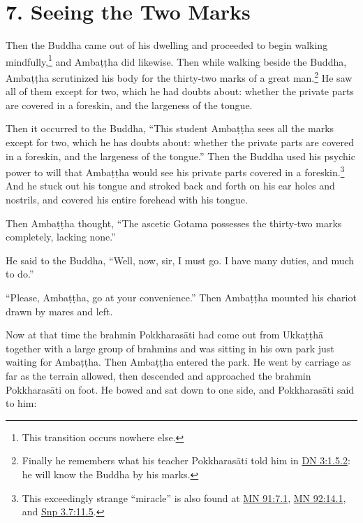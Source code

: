 \documentclass[12pt,openany]{book}%
\begin{document}
\section*{7. Seeing the Two Marks }

Then the Buddha came out of his dwelling and proceeded to begin walking mindfully,\footnote{This transition occurs nowhere else. } and \textsanskrit{Ambaṭṭha} did likewise. Then while walking beside the Buddha, \textsanskrit{Ambaṭṭha} scrutinized his body for the thirty-two marks of a great man.\footnote{Finally he remembers what his teacher \textsanskrit{Pokkharasāti} told him in \href{https://suttacentral.net/dn3/en/sujato\#1.5.2}{DN 3:1.5.2}: he will know the Buddha by his marks. } He saw all of them except for two, which he had doubts about: whether the private parts are covered in a foreskin, and the largeness of the tongue. 

Then it occurred to the Buddha, “This student \textsanskrit{Ambaṭṭha} sees all the marks except for two, which he has doubts about: whether the private parts are covered in a foreskin, and the largeness of the tongue.” Then the Buddha used his psychic power to will that \textsanskrit{Ambaṭṭha} would see his private parts covered in a foreskin.\footnote{This exceedingly strange “miracle” is also found at \href{https://suttacentral.net/mn91/en/sujato\#7.1}{MN 91:7.1}, \href{https://suttacentral.net/mn92/en/sujato\#14.1}{MN 92:14.1}, and \href{https://suttacentral.net/snp3.7/en/sujato\#11.5}{Snp 3.7:11.5}. } And he stuck out his tongue and stroked back and forth on his ear holes and nostrils, and covered his entire forehead with his tongue. 

Then \textsanskrit{Ambaṭṭha} thought, “The ascetic Gotama possesses the thirty-two marks completely, lacking none.” 

He said to the Buddha, “Well, now, sir, I must go. I have many duties, and much to do.” 

“Please, \textsanskrit{Ambaṭṭha}, go at your convenience.” Then \textsanskrit{Ambaṭṭha} mounted his chariot drawn by mares and left. 

Now at that time the brahmin \textsanskrit{Pokkharasāti} had come out from \textsanskrit{Ukkaṭṭhā} together with a large group of brahmins and was sitting in his own park just waiting for \textsanskrit{Ambaṭṭha}. Then \textsanskrit{Ambaṭṭha} entered the park. He went by carriage as far as the terrain allowed, then descended and approached the brahmin \textsanskrit{Pokkharasāti} on foot. He bowed and sat down to one side, and \textsanskrit{Pokkharasāti} said to him: 
\end{document}
